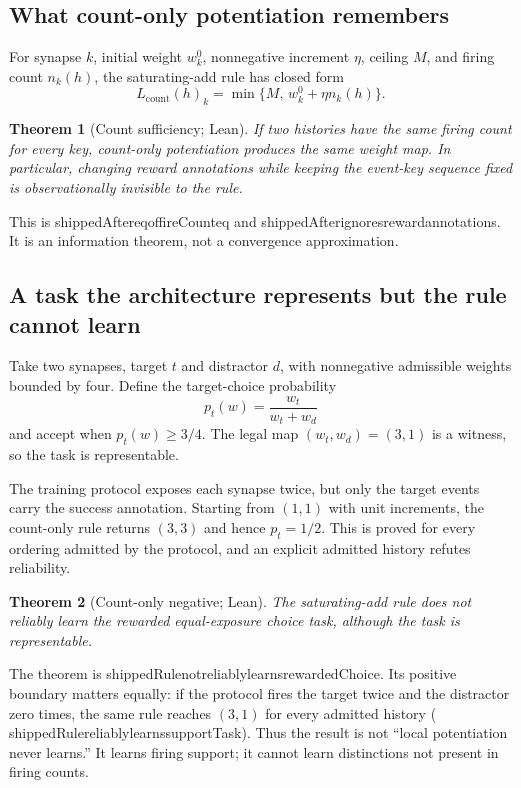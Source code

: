 \documentclass[11pt]{article}
\newtheorem{theorem}{Theorem}[section]
\newcommand{\leanname}[1]{{\scriptsize\ttfamily
  \def\_{\textunderscore\allowbreak}#1}}
\begin{document}
\subsection{What count-only potentiation remembers}

For synapse $k$, initial weight $w^0_k$, nonnegative increment $\eta$, ceiling
$M$, and firing count $n_k(h)$, the saturating-add rule has closed form
\[
  L_{\mathrm{count}}(h)_k
    = \min\{M,\,w^0_k+\eta n_k(h)\}.
\]

\begin{theorem}[Count sufficiency; Lean]
If two histories have the same firing count for every key, count-only
potentiation produces the same weight map.  In particular, changing reward
annotations while keeping the event-key sequence fixed is observationally
invisible to the rule.
\end{theorem}

This is \leanname{shippedAfter\_eq\_of\_fireCount\_eq} and
\leanname{shippedAfter\_ignores\_reward\_annotations}.  It is an information
theorem, not a convergence approximation.

\subsection{A task the architecture represents but the rule cannot learn}

Take two synapses, target $t$ and distractor $d$, with nonnegative admissible
weights bounded by four.  Define the target-choice probability
\[
  p_t(w)=\frac{w_t}{w_t+w_d}
\]
and accept when $p_t(w)\geq 3/4$.  The legal map $(w_t,w_d)=(3,1)$ is a witness,
so the task is representable.

The training protocol exposes each synapse twice, but only the target events
carry the success annotation.  Starting from $(1,1)$ with unit increments,
the count-only rule returns $(3,3)$ and hence $p_t=1/2$.  This is proved for
every ordering admitted by the protocol, and an explicit admitted history
refutes reliability.

\begin{theorem}[Count-only negative; Lean]
The saturating-add rule does not reliably learn the rewarded equal-exposure
choice task, although the task is representable.
\end{theorem}

The theorem is \leanname{shippedRule\_not\_reliably\_learns\_rewardedChoice}.
Its positive boundary matters equally: if the protocol fires the target twice
and the distractor zero times, the same rule reaches $(3,1)$ for every admitted
history (\leanname{shippedRule\_reliably\_learns\_supportTask}).  Thus the
result is not ``local potentiation never learns.''  It learns firing support;
it cannot learn distinctions not present in firing counts.
\end{document}
